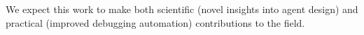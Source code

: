 \documentclass[12pt]{article}
\begin{document}
We expect this work to make both scientific (novel insights into agent design) and practical (improved debugging automation) contributions to the field.

\clearpage


% 
% 

\begingroup
\raggedbottom
{}
\small
\raggedright

\par
\vspace{0.35\baselineskip}

\makeatletter
\renewenvironment{thebibliography}[1]
    {\list{\@biblabel{\@arabic\c@enumiv}}%
        {\settowidth\labelwidth{\@biblabel{#1}}%
         \leftmargin\labelwidth
         \advance\leftmargin\labelsep
         \setlength{\labelsep}{0.5em}%
         \setlength{\topsep}{0pt}%
         \setlength{\partopsep}{0pt}%
         \setlength{\parsep}{0pt}%
         \setlength{\parskip}{0pt}%
         \setlength{\itemsep}{0.22\baselineskip}%
         \usecounter{enumiv}%
         \let\p@enumiv\@empty
         \renewcommand\theenumiv{\@arabic\c@enumiv}}%
     \sloppy\clubpenalty4000\widowpenalty4000\sfcode`\.=1000\relax}
    {\endlist}
\makeatother
\end{document}
